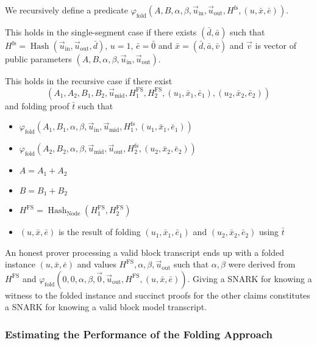 \documentclass{article}
\theoremstyle{plain}
\theoremstyle{definition}
\begin{document}
We recursively define a predicate $\varphi_{\mathrm{fold}}(A,B,\alpha,\beta,\vec{u}_{\mathrm{in}}, \vec{u}_{\mathrm{out}},H^{\mathrm{fs}},(u,\bar{x},\bar{e}))$.

This holds in the single-segment case if there exists $(\bar{d},\bar{a})$ such that
$H^{\mathrm{fs}} = \operatorname{Hash}(\vec{u}_{\mathrm{in}}, \vec{u}_{\mathrm{out}},\bar{d})$,
$u = 1$, $\bar{e} = \bar{0}$ and $\bar{x} = (\bar{d},\bar{a},\bar{v})$
and $\vec{v}$ is vector of public parameters $(A,B,\alpha,\beta,\vec{u}_{\mathrm{in}},\vec{u}_{\mathrm{out}})$.

This holds in the recursive case if there exist $$(A_1,A_2,B_1,B_2,\vec{u}_{\mathrm{mid}},H^{\mathrm{FS}}_1,H^{\mathrm{FS}}_2,(u_1,\bar{x}_1,\bar{e}_1),(u_2,\bar{x}_2,\bar{e}_2))$$ and folding proof $\bar{t}$
such that
\begin{itemize}
\item $\varphi_{\mathrm{fold}}(A_1,B_1,\alpha,\beta,\vec{u}_{\mathrm{in}}, \vec{u}_{\mathrm{mid}},H^{\mathrm{fs}}_1,(u_1,\bar{x}_1,\bar{e}_1))$
\item $\varphi_{\mathrm{fold}}(A_2,B_2,\alpha,\beta,\vec{u}_{\mathrm{mid}}, \vec{u}_{\mathrm{out}},H^{\mathrm{fs}}_2,(u_2,\bar{x}_2,\bar{e}_2))$
\item $A = A_1 + A_2$
\item $B = B_1 + B_2$
\item $H^{\mathrm{FS}} = \operatorname{Hash}_{\mathrm{Node}}(H^{\mathrm{FS}}_1,H^{\mathrm{FS}}_2)$
\item $(u,\bar{x},\bar{e})$ is the result of folding $(u_1,\bar{x}_1,\bar{e}_1)$ and
  $(u_2,\bar{x}_2,\bar{e}_2)$ using $\bar{t}$
\end{itemize}

An honest prover processing a valid block transcript ends up with a folded instance
$(u,\bar{x},\bar{e})$ and values $H^{\mathrm{FS}}, \alpha, \beta, \vec{u}_{\mathrm{out}}$
such that $\alpha,\beta$ were derived from $H^{\mathrm{FS}}$ and $\varphi_{\mathrm{fold}}(0,0,\alpha,\beta,\vec{0},\vec{u}_{\mathrm{out}},H^{\mathrm{FS}},(u,\bar{x},\bar{e}))$.
Giving a SNARK for knowing a witness to the folded instance and succinct proofs for the other claims constitutes a SNARK for knowing a valid block model transcript.

\subsubsection{Estimating the Performance of the Folding Approach}
\label{estimating-performance-folding}
\end{document}
